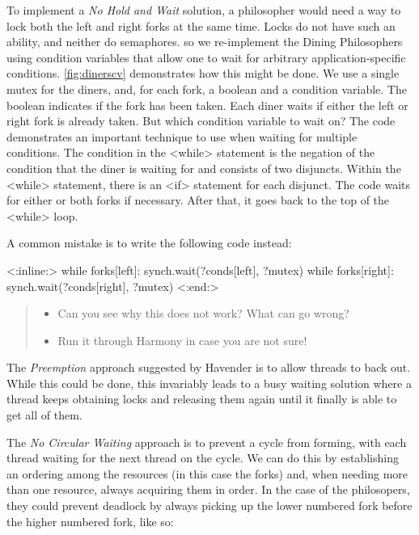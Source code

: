\documentclass{report}
\newenvironment{code}{
\tcolorbox
}{
\endtcolorbox
}
\begin{document}
To implement a \emph{No Hold and Wait} solution, a philosopher would need a
way to lock both the left and right forks at the same time.  Locks do not
have such an ability, and neither do semaphores. so we re-implement the
Dining Philosophers using condition variables that allow one to wait for
arbitrary application-specific conditions.
%
\autoref{fig:dinerscv} demonstrates how this might be done.
We use a single mutex for the diners, and, for each fork, a boolean
and a condition variable.  The boolean indicates if the fork has been
taken.
Each diner waits if either the left or right fork is already taken.
But which condition variable to wait on?
The code demonstrates an important technique to use when waiting for
multiple conditions.
%
The condition in the <{while}> statement is the negation of the
condition that the diner is waiting for and consists of two disjuncts.
Within the <{while}> statement,
there is an <{if}> statement for each disjunct.
The code waits for either or both forks if necessary.  After that, it goes
back to the top of the <{while}> loop.

A common mistake is to write the following code instead:

\begin{code}
<{:inline:}>
while forks[left]:
    synch.wait(?conds[left], ?mutex)
while forks[right]:
    synch.wait(?conds[right], ?mutex)
<{:end:}>
\end{code}

\begin{quote}
\begin{itemize}
\item Can you see why this does not work?  What can go wrong?
\item Run it through Harmony in case you are not sure!
\end{itemize}
\end{quote}

The \emph{Preemption} approach suggested by Havender is to allow threads to back out.
While this could be done, this invariably leads to a busy waiting solution
where a thread keeps obtaining locks and releasing them again until it
finally is able to get all of them.

The \emph{No Circular Waiting} approach
is to prevent a cycle from forming, with each
thread waiting for the next thread on the cycle.
We can do this by establishing an ordering among the
resources (in this case the forks) and, when needing more than one
resource, always acquiring them in order.  In the case of the philosopers,
they could prevent deadlock by always picking up the lower numbered fork
before the higher numbered fork, like so:
\end{document}
